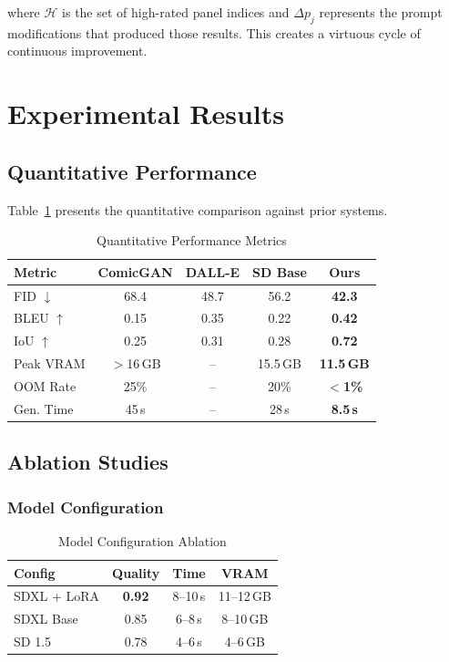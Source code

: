 \documentclass[11pt,a4paper,twocolumn]{article}
\begin{document}
\noindent where $\mathcal{H}$ is the set of high-rated panel indices and $\Delta p_j$ represents the prompt modifications that produced those results. This creates a virtuous cycle of continuous improvement.

\section{Experimental Results}
\label{sec:results}

\subsection{Quantitative Performance}

Table~\ref{tab:quant_results} presents the quantitative comparison against prior systems.

\begin{table}[H]
\caption{Quantitative Performance Metrics}
\label{tab:quant_results}
\centering
\scriptsize
\begin{tabular}{lcccc}
\toprule
\textbf{Metric} & \textbf{ComicGAN} & \textbf{DALL-E} & \textbf{SD Base} & \textbf{Ours} \\
\midrule
FID $\downarrow$ & 68.4 & 48.7 & 56.2 & \textbf{42.3} \\
BLEU $\uparrow$ & 0.15 & 0.35 & 0.22 & \textbf{0.42} \\
IoU $\uparrow$ & 0.25 & 0.31 & 0.28 & \textbf{0.72} \\
Peak VRAM & $>$16\,GB & -- & 15.5\,GB & \textbf{11.5\,GB} \\
OOM Rate & 25\% & -- & 20\% & \textbf{$<$1\%} \\
Gen. Time & 45\,s & -- & 28\,s & \textbf{8.5\,s} \\
\bottomrule
\end{tabular}
\end{table}

\subsection{Ablation Studies}

\subsubsection{Model Configuration}

\begin{table}[H]
\caption{Model Configuration Ablation}
\centering
\scriptsize
\begin{tabular}{lccc}
\toprule
\textbf{Config} & \textbf{Quality} & \textbf{Time} & \textbf{VRAM} \\
\midrule
SDXL + LoRA & \textbf{0.92} & 8--10\,s & 11--12\,GB \\
SDXL Base & 0.85 & 6--8\,s & 8--10\,GB \\
SD 1.5 & 0.78 & 4--6\,s & 4--6\,GB \\
\bottomrule
\end{tabular}
\end{table}
\end{document}
